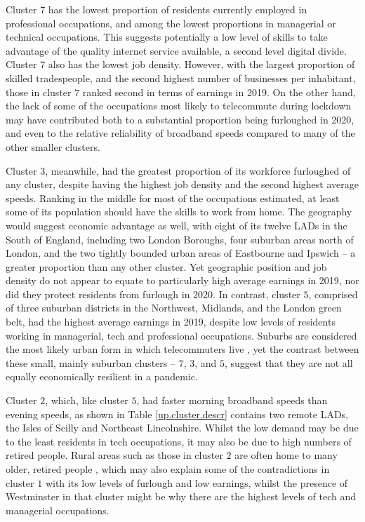 \documentclass[]{interact}
\theoremstyle{plain}%
\theoremstyle{definition}
\theoremstyle{remark}
\begin{document}
Cluster \(7\) has the lowest proportion of residents currently employed
in professional occupations, and among the lowest proportions in
managerial or technical occupations. This suggests potentially a low
level of skills to take advantage of the quality internet service
available, a second level digital divide. Cluster \(7\) also has the
lowest job density. However, with the largest proportion of skilled
tradespeople, and the second highest number of businesses per
inhabitant, those in cluster \(7\) ranked second in terms of earnings in
2019. On the other hand, the lack of some of the occupations most likely
to telecommute during lockdown may have contributed both to a
substantial proportion being furloughed in 2020, and even to the
relative reliability of broadband speeds compared to many of the other
smaller clusters.

Cluster \(3\), meanwhile, had the greatest proportion of its workforce
furloughed of any cluster, despite having the highest job density and
the second highest average speeds. Ranking in the middle for most of the
occupations estimated, at least some of its population should have the
skills to work from home. The geography would suggest economic advantage
as well, with eight of its twelve LADs in the South of England,
including two London Boroughs, four suburban areas north of London, and
the two tightly bounded urban areas of Eastbourne and Ipswich -- a
greater proportion than any other cluster. Yet geographic position and
job density do not appear to equate to particularly high average
earnings in 2019, nor did they protect residents from furlough in 2020.
In contrast, cluster \(5\), comprised of three suburban districts in the
Northwest, Midlands, and the London green belt, had the highest average
earnings in 2019, despite low levels of residents working in managerial,
tech and professional occupations. Suburbs are considered the most
likely urban form in which telecommuters live \citep{e2018does}, yet the
contrast between these small, mainly suburban clusters -- \(7\), \(3\),
and \(5\), suggest that they are not all equally economically resilient
in a pandemic.

Cluster \(2\), which, like cluster \(5\), had faster morning broadband
speeds than evening speeds, as shown in Table \ref{up.cluster.descr}
contains two remote LADs, the Isles of Scilly and Northeast
Lincolnshire. Whilst the low demand may be due to the least residents in
tech occupations, it may also be due to high numbers of retired people.
Rural areas such as those in cluster \(2\) are often home to many older,
retired people \citep{blank2018local}, which may also explain some of
the contradictions in cluster \(1\) with its low levels of furlough and
low earnings, whilst the presence of Westminster in that cluster might
be why there are the highest levels of tech and managerial occupations.
\end{document}
